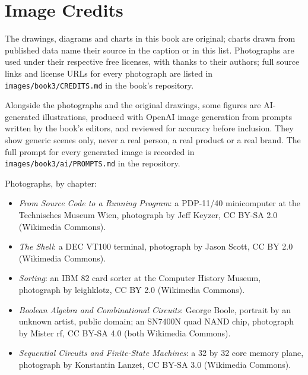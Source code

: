 \chapter*{Image Credits}

The drawings, diagrams and charts in this book are original; charts drawn
from published data name their source in the caption or in this list.
Photographs are used under their respective free licenses, with thanks to
their authors; full source links and license URLs for every photograph are
listed in \texttt{images/book3/CREDITS.md} in the book's repository.

\bigskip
Alongside the photographs and the original drawings, some figures are
AI-generated illustrations, produced with OpenAI image generation from
prompts written by the book's editors, and reviewed for accuracy before
inclusion. They show generic scenes only, never a real person, a real
product or a real brand. The full prompt for every generated image is
recorded in \texttt{images/book3/ai/PROMPTS.md} in the repository.

\bigskip
\noindent Photographs, by chapter:
\begin{itemize}\small
  \item \textit{From Source Code to a Running Program}: a PDP-11/40 minicomputer at the
    Technisches Museum Wien, photograph by Jeff Keyzer, CC BY-SA 2.0
    (Wikimedia Commons).
  \item \textit{The Shell}: a DEC VT100 terminal, photograph by Jason Scott,
    CC BY 2.0 (Wikimedia Commons).
  \item \textit{Sorting}: an IBM 82 card sorter at the Computer History
    Museum, photograph by leighklotz, CC BY 2.0 (Wikimedia Commons).
  \item \textit{Boolean Algebra and Combinational Circuits}: George Boole,
    portrait by an unknown artist, public domain; an SN7400N quad NAND chip,
    photograph by Mister rf, CC BY-SA 4.0 (both Wikimedia Commons).
  \item \textit{Sequential Circuits and Finite-State Machines}: a 32 by 32
    core memory plane, photograph by Konstantin Lanzet, CC BY-SA 3.0
    (Wikimedia Commons).
\end{itemize}
